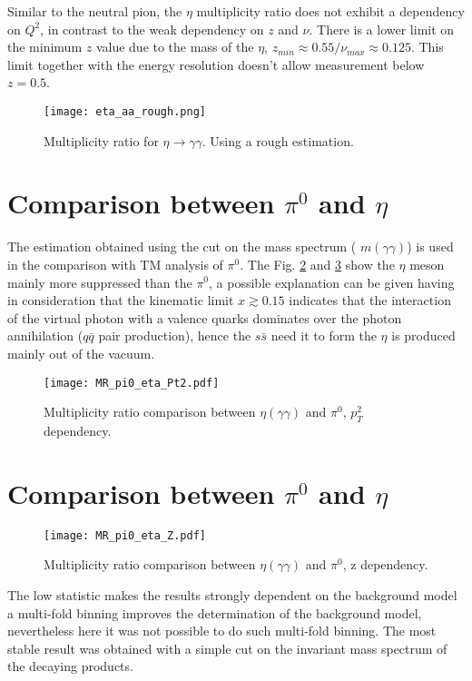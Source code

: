 Similar to the neutral pion, the  $\eta$ multiplicity ratio does not exhibit a dependency on $Q^2$, in contrast to the weak dependency on $z$ and $\nu$. There is a lower limit on the minimum $z$ value due to the mass of the $\eta$, $z_{min}\approx 0.55/\nu_{max} \approx 0.125$. This limit together with the energy resolution doesn't allow measurement below $z=0.5$.
%
\begin{figure}[H]
\centering
\texttt{[image: eta\_aa\_rough.png]}
\caption{Multiplicity ratio for $\eta \rightarrow \gamma\gamma$. Using a rough estimation.}
\label{fig:MR_eta_aa_rough}
\end{figure} 
% 
\section{Comparison between $\pi^0$ and $\eta$ }
The estimation obtained using the cut on the mass spectrum ( $m(\gamma \gamma )$) is used in the comparison with TM analysis of $\pi^0$. The Fig. \ref{fig:MR_eta_pi0_aa_pt2} and \ref{fig:MR_eta_pi0_aa_z} show the $\eta$ meson mainly more suppressed than the $\pi^0$, a possible explanation can be given having in consideration that the kinematic limit $x \gtrsim 0.15$ indicates that the interaction of the virtual photon with a valence quarks dominates over the photon annihilation ($q \bar{q}$ pair production), hence the $s\bar{s}$ need it to form the $\eta$ is produced mainly out of the vacuum.

\begin{figure}[H]
\centering
\texttt{[image: MR\_pi0\_eta\_Pt2.pdf]}
\caption{Multiplicity ratio comparison between $\eta(\gamma\gamma)$ and $\pi^0$, $p_T^2$ dependency.}
\label{fig:MR_eta_pi0_aa_pt2}
\end{figure} 
%
\section{Comparison between $\pi^0$ and $\eta$}
\begin{figure}[H]
\centering
\texttt{[image: MR\_pi0\_eta\_Z.pdf]}
\caption{Multiplicity ratio comparison between $\eta(\gamma\gamma)$ and $\pi^0$, z dependency.}
\label{fig:MR_eta_pi0_aa_z}
\end{figure} 
% 
%
%
%
The low statistic makes the results strongly dependent on the background model a multi-fold binning improves the determination of the background model, nevertheless here it was not possible to do such multi-fold binning. The most stable result was obtained with a simple cut on the invariant mass spectrum of the decaying products.

